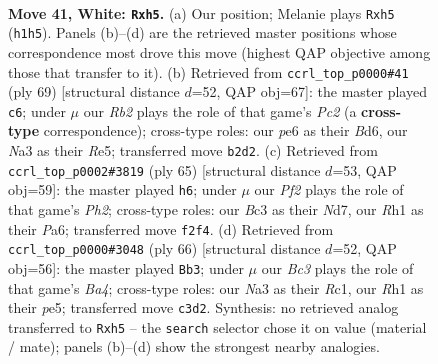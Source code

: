 \documentclass[11pt]{article}
\begin{document}
\clearpage

\begin{figure}[p]\centering
\begin{subfigure}{0.46\textwidth}\centering
\resizebox{\linewidth}{!}{%
\newchessgame
\chessboard[
  setfen={1rr5/pn3p1k/1p2p2p/7p/2P5/N1B1P3/PR3PP1/5K1R w - - 0 41},
  showmover=false,
  pgfstyle=straightmove, color=movearrow, markmove={h1-h5}
]}
\caption{}
\end{subfigure}\hfill
\begin{subfigure}{0.46\textwidth}\centering
\resizebox{\linewidth}{!}{%
\newchessgame
\chessboard[
  setfen={8/2p3pk/3b1r2/P2pr2p/P3p3/2P3P1/5PNP/1R1R2K1 b - - 2 35},
  showmover=false,
  pgfstyle=straightmove, color=movearrow, markmove={c7-c6}
]}
\caption{}
\end{subfigure}
\\[4pt]
\begin{subfigure}{0.46\textwidth}\centering
\resizebox{\linewidth}{!}{%
\newchessgame
\chessboard[
  setfen={1r4k1/3n3p/p3r1p1/P2N2P1/2p1p2P/6K1/1PP5/1R2R3 b - - 0 33},
  showmover=false,
  pgfstyle=straightmove, color=movearrow, markmove={h7-h6}
]}
\caption{}
\end{subfigure}\hfill
\begin{subfigure}{0.46\textwidth}\centering
\resizebox{\linewidth}{!}{%
\newchessgame
\chessboard[
  setfen={1rr5/1p2kp2/4n2p/1RP1pp2/B7/4P1P1/5P1P/2R3K1 w - - 4 34},
  showmover=false,
  pgfstyle=straightmove, color=movearrow, markmove={a4-b3}
]}
\caption{}
\end{subfigure}
\caption{\textbf{Move 41, White: \texttt{Rxh5}.} (a) Our position; Melanie plays \texttt{Rxh5} (\texttt{h1h5}). Panels (b)--(d) are the retrieved master positions whose correspondence most drove this move (highest QAP objective among those that transfer to it). (b) Retrieved from \texttt{ccrl\_top\_p0000\#41} (ply 69) [structural distance $d$=52, QAP obj=67]: the master played \texttt{c6}; under $\mu$ our \emph{Rb2} plays the role of that game's \emph{Pc2} (a \textbf{cross-type} correspondence); cross-type roles: our \emph{p}e6 as their \emph{B}d6, our \emph{N}a3 as their \emph{R}e5; transferred move \texttt{b2d2}. (c) Retrieved from \texttt{ccrl\_top\_p0002\#3819} (ply 65) [structural distance $d$=53, QAP obj=59]: the master played \texttt{h6}; under $\mu$ our \emph{Pf2} plays the role of that game's \emph{Ph2}; cross-type roles: our \emph{B}c3 as their \emph{N}d7, our \emph{R}h1 as their \emph{P}a6; transferred move \texttt{f2f4}. (d) Retrieved from \texttt{ccrl\_top\_p0000\#3048} (ply 66) [structural distance $d$=52, QAP obj=56]: the master played \texttt{Bb3}; under $\mu$ our \emph{Bc3} plays the role of that game's \emph{Ba4}; cross-type roles: our \emph{N}a3 as their \emph{R}c1, our \emph{R}h1 as their \emph{p}e5; transferred move \texttt{c3d2}. Synthesis: no retrieved analog transferred to \texttt{Rxh5} -- the \texttt{search} selector chose it on value (material / mate); panels (b)--(d) show the strongest nearby analogies.}
\label{fig:thought-m80}
\end{figure}
\end{document}
